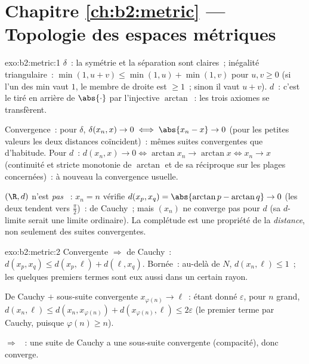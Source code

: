 \section*{Chapitre \ref{ch:b2:metric} --- Topologie des espaces métriques}

\begin{solution}{exo:b2:metric:1}
$\delta$~: la symétrie et la séparation sont claires~; inégalité
triangulaire~: $\min(1, u + v) \leq \min(1,u) + \min(1,v)$ pour $u, v
\geq 0$ (si l'un des min vaut $1$, le membre de droite est $\geq 1$~;
sinon il vaut $u + v$). $d$~: c'est le tiré en arrière de
$\abs{\cdot}$ par l'injective $\arctan$~: les trois axiomes se
transfèrent.

Convergence~: pour $\delta$, $\delta(x_n, x) \to 0 \iff \abs{x_n - x}
\to 0$ (pour les petites valeurs les deux distances coïncident)~:
mêmes suites convergentes que d'habitude. Pour $d$~: $d(x_n, x) \to 0
\iff \arctan x_n \to \arctan x \iff x_n \to x$ (continuité et stricte
monotonie de $\arctan$ et de sa réciproque sur les plages
concernées)~: à nouveau la convergence usuelle.

$(\R, d)$ n'est \emph{pas} ~: $x_n = n$ vérifie $d(x_p, x_q)
= \abs{\arctan p - \arctan q} \to 0$ (les deux tendent vers
$\frac\pi2$)~: de Cauchy~; mais $(x_n)$ ne converge pas pour $d$ (sa
$d$-limite serait une limite ordinaire). La complétude est une
propriété de la \emph{distance}, non seulement des suites
convergentes.
\end{solution}

\begin{solution}{exo:b2:metric:2}
Convergente $\Rightarrow$ de Cauchy~: $d(x_p, x_q) \leq d(x_p, \ell)
+ d(\ell, x_q)$. Bornée~: au-delà de $N$, $d(x_n, \ell) \leq 1$~; les
quelques premiers termes sont eux aussi dans un certain rayon.

De Cauchy $+$ sous-suite convergente $x_{\varphi(n)} \to \ell$~:
étant donné $\varepsilon$, pour $n$ grand, $d(x_n, \ell) \leq d(x_n,
x_{\varphi(n)}) + d(x_{\varphi(n)}, \ell) \leq 2\varepsilon$ (le
premier terme par Cauchy, puisque $\varphi(n) \geq n$).

 $\Rightarrow$ ~: une suite de Cauchy a une sous-suite
convergente (compacité), donc converge.
\end{solution}

